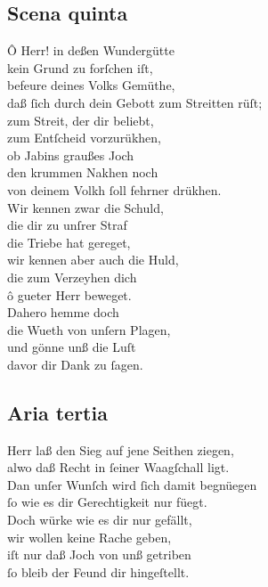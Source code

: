 \documentclass{ees}
\newenvironment{lyrics}[1]{%
  \subsection{#1}\nopagebreak%
  \begin{lyricslist}%
  \let\voice\item%
}{%
  \end{lyricslist}%
}
\begin{document}
\begin{lyrics}{Scena quinta}
  \voice[Debora]
  Ô Herr! in deßen Wundergütte\\
  kein Grund zu forſchen iſt,\\
  befeure deines Volks Gemüthe,\\
  daß ſich durch dein Gebott zum Streitten rüſt;\\
  zum Streit, der dir beliebt,\\
  zum Entſcheid vorzurükhen,\\
  ob Jabins graußes Joch\\
  den krummen Nakhen noch\\
  von deinem Volkh ſoll fehrner drükhen.\\
  Wir kennen zwar die Schuld,\\
  die dir zu unſrer Straf\\
  die Triebe hat gereget,\\
  wir kennen aber auch die Huld,\\
  die zum Verzeyhen dich\\
  ô gueter Herr beweget.\\
  Dahero hemme doch\\
  die Wueth von unſern Plagen,\\
  und gönne unß die Luſt\\
  davor dir Dank zu ſagen.
\end{lyrics}

\clearpage
\begin{lyrics}{Aria tertia}
  \voice[Debora]
  Herr laß den Sieg auf jene Seithen ziegen,\\
  alwo daß Recht in ſeiner Waagſchall ligt.\\
  Dan unſer Wunſch wird ſich damit begnüegen\\
  ſo wie es dir Gerechtigkeit nur füegt.\\[1ex]
  Doch würke wie es dir nur gefällt,\\
  wir wollen keine Rache geben,\\
  iſt nur daß Joch von unß getriben\\
  ſo bleib der Feund dir hingeſtellt.
\end{lyrics}
\end{document}
